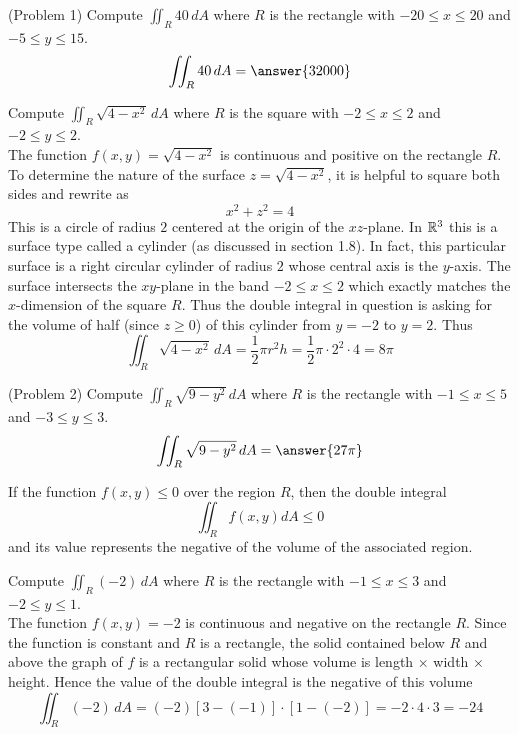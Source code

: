 \documentclass[handout]{ximera}
\begin{document}
\begin{problem}(Problem 1)
Compute $\iint_R 40 \, dA$ where $R$ is the rectangle with $-20 \leq x \leq 20$ and $-5 \leq y \leq 15$.\\
\[
\iint_R 40 \, dA = \answer{32000}
\]
\end{problem}

\begin{example}[Example 2]
Compute $\iint_R \sqrt{4 - x^2} \, dA$ where $R$ is the square with $-2 \leq x \leq 2$ and $-2 \leq y \leq 2$.\\
The function $f(x,y) = \sqrt{4-x^2}$ is continuous and positive on the rectangle $R$.  To determine the nature of the 
surface $z = \sqrt{4-x^2}$, it is helpful to square both sides and rewrite as
\[
x^2 + z^2 = 4
\]
This is a circle of radius $2$ centered at the origin of the $xz$-plane.  In $\mathbb R^3$ this is a surface type called a cylinder (as discussed in section 1.8).
In fact, this particular surface is a right circular cylinder of radius $2$ whose central axis is the $y$-axis. The surface intersects the $xy$-plane in the 
band $-2 \leq x \leq 2$ which exactly matches the $x$-dimension of the square $R$.
Thus the double integral in question is asking for the volume of half (since $z \geq 0$) of this cylinder from $y = -2$ to $ y = 2$. Thus
\[
\iint_R \sqrt{4 - x^2} \, dA = \frac12 \pi r^2 h = \frac12 \pi \cdot 2^2 \cdot 4 = 8\pi
\]
\end{example}


\begin{problem}(Problem 2)
Compute $\iint_R \sqrt{9 - y^2} \, dA$ where $R$ is the rectangle with $-1 \leq x \leq 5$ and $-3 \leq y \leq 3$.\\
\[
\iint_R \sqrt{9 - y^2} \, dA = \answer{27\pi}
\]
\end{problem}

\begin{remark} If the function $f(x,y) \leq 0$ over the region $R$, then the double integral
\[
\iint_{R} f(x,y) dA \leq 0
\]
and its value represents the negative of the volume of the associated region.
\end{remark}

\begin{example}[Example 3]
Compute $\iint_R (-2) \, dA$ where $R$ is the rectangle with $-1 \leq x \leq 3$ and $-2 \leq y \leq 1$.\\
The function $f(x,y) = -2$ is continuous and negative on the rectangle $R$.  Since the function is constant and $R$ is a rectangle, the solid contained below $R$
and above the graph of $f$ is a rectangular solid whose volume is length $\times$ width $\times$ height.
Hence the value of the double integral is the negative of this volume
\[
\iint_R (-2) \, dA = (-2)[3-(-1)] \cdot [1-(-2)] = -2 \cdot 4 \cdot 3 = -24
\]
\end{example}
\end{document}
